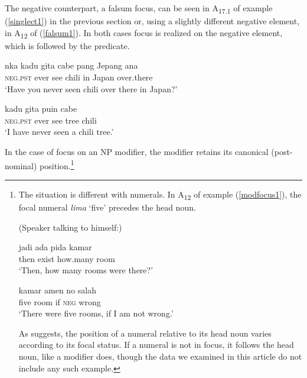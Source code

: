 \documentclass[output=paper
,modfonts
,nonflat]{langsci/langscibook}
\begin{document}
\noindent The negative counterpart, a falsum focus, can be seen in A\textsubscript{{17.1}} of example (\ref{singlect1}) in the previous section or, using a slightly different negative element, in A\textsubscript{{12}} of (\ref{falsum1}). In both cases focus is realized on the negative element, which is  followed by the predicate.

\begin{exe}
	\ex\label{falsum1}
	\begin{xlist}[Q\textsubscript{{12}}:]
		\gll nka kadu gita cabe pang Jepang ana{\USQMark}\\
		\textsc{neg.pst} ever see chili in Japan over.there\\
		\glt `Have you never seen chili over there in Japan?'
	\end{xlist}
	\begin{xlist}[> A\textsubscript{{12}}:]
		 kadu gita {{\ob}puin} {cabe{\cb}\topic{\cb}\sq}\\
		\textsc{\hphantom{[[}neg.pst} \hphantom{[}ever see tree chili\\
		\glt `I have never seen a chili tree.'
	\end{xlist}
\end{exe}

  
\noindent In the case of focus on an NP modifier, the modifier retains its canonical (post-nominal) position.\footnote{The situation is different with numerals. In A\textsubscript{{12}} of example (\ref{modfocus1}), the focal numeral \textit{lima} `five' precedes the head noun. 
	
	\begin{exe}
		\ex (Speaker talking to himself:) 
		\begin{xlist}[Q\textsubscript{{12}}:]
			\gll jadi ada pida kamar\\
			then exist how.many room\\
			\glt `Then, how many rooms were there?'
		\end{xlist}
		\begin{xlist}[> A\textsubscript{{12}}:]  
			 {kamar{\cb}\sq} {{\ob}amen} no {salah{\cb}\nai}\\
			\hphantom{[[}five room \hphantom{[}if \textsc{neg} wrong\\
			\glt `There were five rooms, if I am not wrong.'
		\end{xlist}
	\end{exe}
	
	\noindent As \citet{shias14} suggests, the position of a numeral relative to its head noun varies according to its focal status. If a numeral is not in focus, it follows the head noun, like a modifier does, though the data we examined in this article do not include any such example.
} 
\end{document}
